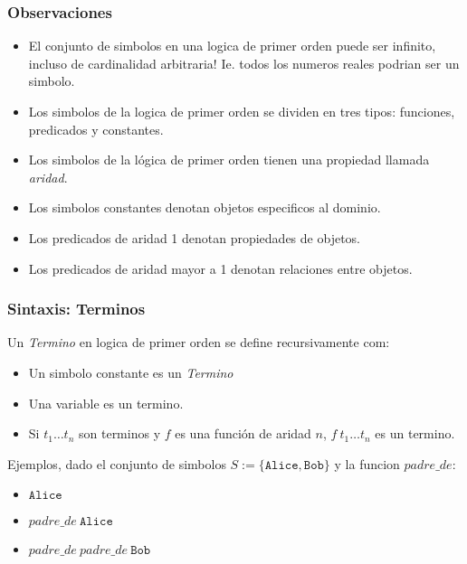 \documentclass{beamer}
\begin{document}
\begin{frame}
    \frametitle{Observaciones}
    \begin{itemize}
        \item{El conjunto de simbolos en una logica de primer orden puede ser
        infinito, incluso de cardinalidad arbitraria! Ie. todos los numeros
        reales podrian ser un simbolo.}
        \item{Los simbolos de la logica de primer orden se dividen en tres tipos:
        funciones, predicados y constantes.}
        \item{Los simbolos de la l\'ogica de primer orden tienen una propiedad
        llamada \emph{aridad}.}
        \item{Los simbolos constantes denotan objetos especificos al dominio.}
        \item{Los predicados de aridad 1 denotan propiedades de objetos.}
        \item{Los predicados de aridad mayor a 1 denotan relaciones entre objetos.}
    \end{itemize}
\end{frame}

\begin{frame}
    \frametitle{Sintaxis: Terminos}
    Un \emph{Termino} en logica de primer orden se define recursivamente com:
    \begin{itemize}
        \item{Un simbolo constante es un \emph{Termino}}
        \item{Una variable es un termino.}
        \item{Si $t_1\ldots t_n$ son terminos y $f$ es una funci\'on de aridad $n$, $f\ t_1\ldots t_n$ es un termino.}
    \end{itemize}
    Ejemplos, dado el conjunto de simbolos $S:=\{\mathtt{Alice},\mathtt{Bob}\}$ y la funcion $padre\_de$:
    \begin{itemize}
        \item{$\mathtt{Alice}$}
        \item{$padre\_de\ \mathtt{Alice}$}
        \item{$padre\_de\ padre\_de\ \mathtt{Bob}$}
    \end{itemize}
\end{frame}
\end{document}
